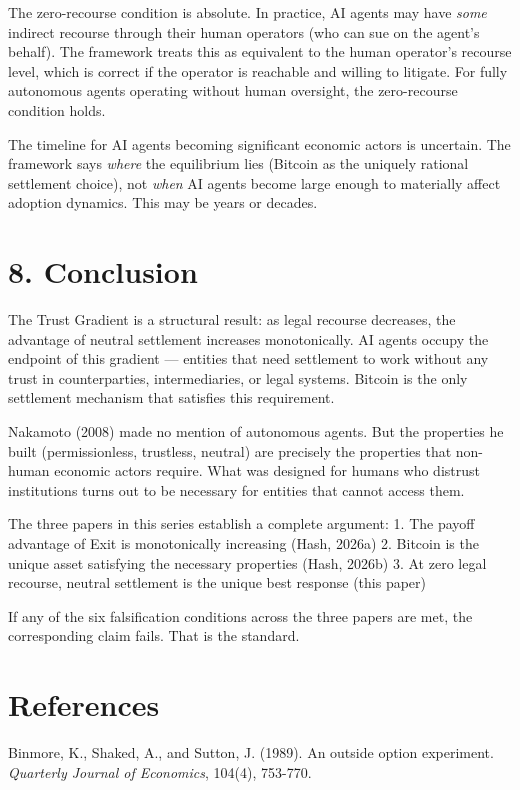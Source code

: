 \documentclass[12pt]{article}
\theoremstyle{definition}
\theoremstyle{remark}
\begin{document}
The zero-recourse condition is absolute. In practice, AI agents may have
\emph{some} indirect recourse through their human operators (who can sue
on the agent's behalf). The framework treats this as equivalent to the
human operator's recourse level, which is correct if the operator is
reachable and willing to litigate. For fully autonomous agents operating
without human oversight, the zero-recourse condition holds.

The timeline for AI agents becoming significant economic actors is
uncertain. The framework says \emph{where} the equilibrium lies (Bitcoin
as the uniquely rational settlement choice), not \emph{when} AI agents
become large enough to materially affect adoption dynamics. This may be
years or decades.


\section{8. Conclusion}\label{conclusion}

The Trust Gradient is a structural result: as legal recourse decreases,
the advantage of neutral settlement increases monotonically. AI agents
occupy the endpoint of this gradient --- entities that need settlement
to work without any trust in counterparties, intermediaries, or legal
systems. Bitcoin is the only settlement mechanism that satisfies this
requirement.

Nakamoto (2008) made no mention of autonomous agents. But the properties
he built (permissionless, trustless, neutral) are precisely the
properties that non-human economic actors require. What was designed for
humans who distrust institutions turns out to be necessary for entities
that cannot access them.

The three papers in this series establish a complete argument: 1. The
payoff advantage of Exit is monotonically increasing (Hash, 2026a) 2.
Bitcoin is the unique asset satisfying the necessary properties (Hash,
2026b) 3. At zero legal recourse, neutral settlement is the unique best
response (this paper)

If any of the six falsification conditions across the three papers are
met, the corresponding claim fails. That is the standard.


\section{References}\label{references}

Binmore, K., Shaked, A., and Sutton, J. (1989). An outside option
experiment. \emph{Quarterly Journal of Economics}, 104(4), 753-770.
\end{document}
